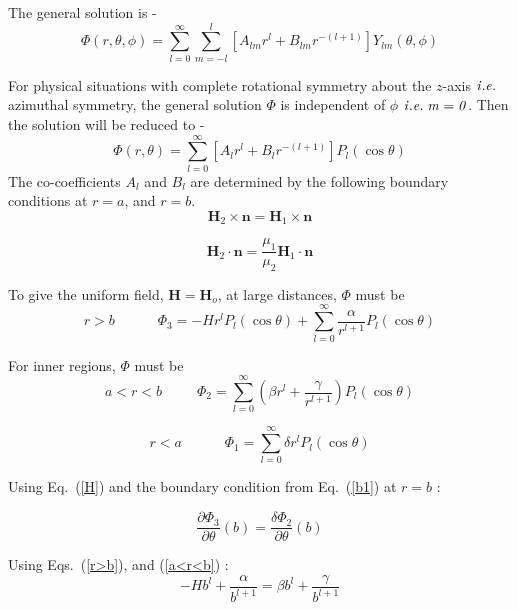 The general solution is -
\begin{equation}
\Phi(r,\theta, \phi)=\sum_{l=0}^{\infty}\sum_{m=-l}^l [A_{lm}r^l+B_{lm}r^{-(l+1)}]Y_{lm}(\theta, \phi)
\end{equation}

For physical situations with complete rotational symmetry about the $z$-axis $\it{i.e.}$ azimuthal symmetry, the general solution $\Phi$ is independent of $\phi$ $\it{i.e.}\;m=0$. Then the solution will be reduced to -
\begin{equation}
\Phi(r,\theta)=\sum_{l=0}^{\infty} [A_lr^l+B_lr^{-(l+1)}]P_l(\cos\theta)
\end{equation}
The co-coefficients $A_l$ and $B_l$ are determined by the following boundary conditions at $r=a$, and $r=b$.
\begin{equation}\label{b1}   
\bm{H}_2\times \bm{n} = \bm{H}_1\times \bm{n}  
\end{equation}

\begin{equation}\label{b2}   
\bm{H}_2\cdot \bm{n}=\frac{\mu_{1}}{\mu_{2}}\bm{H}_1\cdot \bm{n}
\end{equation}


To give the uniform field, $\bm{H}=\bm{H}_o$, at large distances, $\Phi$ must be
\begin{equation}\label{r>b}
r>b\;\;\;\;\;\;\;\;\;\;\;\Phi_3=-Hr^lP_l(\cos\theta)+\sum_{l=0}^{\infty}\frac{\alpha}{r^{l+1}}P_l(\cos\theta)
\end{equation}

For inner regions, $\Phi$ must be
\begin{equation}\label{a<r<b}
a<r<b\;\;\;\;\;\;\;\;\;\Phi_2=\sum_{l=0}^{\infty} \left(\beta r^l+\frac{\gamma}{r^{l+1}}\right)P_l(\cos\theta)
\end{equation}

\begin{equation}\label{r<a}
r<a\;\;\;\;\;\;\;\;\;\;\;\Phi_1=\sum_{l=0}^{\infty} \delta r^l P_l(\cos\theta)
\end{equation}

Using Eq.~(\ref{H}) and the boundary condition from Eq.~(\ref{b1}) at $r=b$ :

$$\frac{\partial \Phi_3}{\partial \theta}(b)=\frac{\delta \Phi_2}{\partial \theta}(b)$$

Using Eqs.~(\ref{r>b}), and (\ref{a<r<b}) :
\begin{equation}\label{e01}
-Hb^l+\frac{\alpha}{b^{l+1}}=\beta b^l+\frac{\gamma}{b^{l+1}}
\end{equation}

